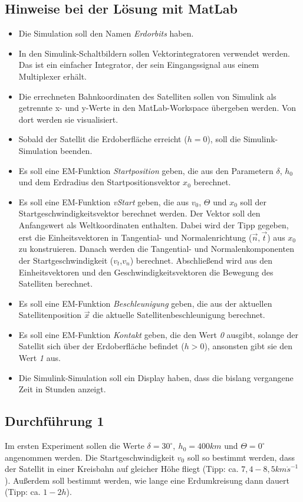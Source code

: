 \documentclass[]{scrartcl}
\begin{document}
\subsection{Hinweise bei der Lösung mit MatLab}
\begin{itemize}
\item Die Simulation soll den Namen \textit{Erdorbits} haben.
\item In den Simulink-Schaltbildern sollen Vektorintegratoren verwendet werden. Das ist ein einfacher Integrator, der sein Eingangssignal aus einem Multiplexer erhält.
\item Die errechneten Bahnkoordinaten des Satelliten sollen von Simulink als getrennte x- und y-Werte in den MatLab-Workspace übergeben werden. Von dort werden sie visualisiert.
\item Sobald der Satellit die Erdoberfläche erreicht ($h=0$), soll die Simulink-Simulation beenden.
\item Es soll eine EM-Funktion \textit{Startposition} geben, die aus den Parametern $\delta$, $h_{0}$ und dem Erdradius den Startpositionsvektor $x_{0}$ berechnet.
\item Es soll eine EM-Funktion \textit{vStart} geben, die aus $v_{0}$, $\Theta$ und $x_{0}$ soll der Startgeschwindigkeitsvektor berechnet werden. Der Vektor soll den Anfangswert als Weltkoordinaten enthalten. Dabei wird der Tipp gegeben, erst die Einheitsvektoren in Tangential- und Normalenrichtung ($\vec{n},\vec{t}$) aus $x_{0}$ zu konstruieren. Danach werden die Tangential- und Normalenkomponenten der Startgeschwindigkeit ($v_{t}$,$v_{n}$) berechnet. Abschließend wird aus den Einheitsvektoren und den Geschwindigkeitsvektoren die Bewegung des Satelliten berechnet.
\item Es soll eine EM-Funktion \textit{Beschleunigung} geben, die aus der aktuellen Satellitenposition $\vec{x}$ die aktuelle Satellitenbeschleunigung berechnet.
\item Es soll eine EM-Funktion \textit{Kontakt} geben, die den Wert \textit{0} ausgibt, solange der Satellit sich über der Erdoberfläche befindet ($h > 0$), ansonsten gibt sie den Wert \textit{1} aus.
\item Die Simulink-Simulation soll ein Display haben, dass die bislang vergangene Zeit in Stunden anzeigt.
\end{itemize}

\subsection{Durchführung 1}
Im ersten Experiment sollen die Werte $\delta = 30^\circ,\ h_{0} = 400km$ und $\Theta=0^\circ$ angenommen werden. Die Startgeschwindigkeit $v_{0}$ soll so bestimmt werden, dass der Satellit in einer Kreisbahn auf gleicher Höhe fliegt (Tipp: ca. $7,4 - 8,5 km \dot s^{-1}$). Außerdem soll bestimmt werden, wie lange eine Erdumkreisung dann dauert (Tipp: ca. $1 - 2h$).
\end{document}
